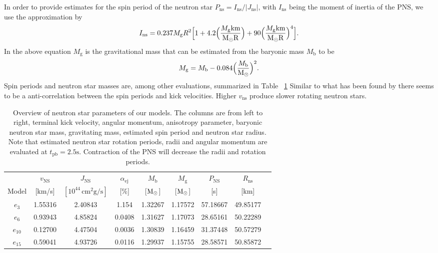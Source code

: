 \documentclass[fleqn,usenatbib]{mnras}
\newcommand{\tpb}{\ensuremath{t_{\text{pb}}}}
\newcommand{\solm}{\xspace\ensuremath{\rm{M_{\odot}}}\xspace}
\renewcommand{\sec}{\xspace\ensuremath{\text{s}}}
\newcommand{\rns}{$R_{\mathrm{ns}}$\xspace\xspace}
\begin{document}
In order to provide estimates for the spin period of the neutron star $P_{\mathrm{ns}}=I_{\mathrm{ns}}/|J_{\mathrm{ns}}|$, with $I_{\mathrm{ns}}$ being the moment of inertia of the PNS, we use the approximation by \citet{Lattimer2004}
\begin{equation}
    I_{\mathrm{ns}} = 0.237M_{\mathrm{g}}R^2\Big[ 1 + 
    4.2 \Big( \frac{M_{\mathrm{g}} \mathrm{km }}{\solm R}\Big)  + 
    90 \Big( \frac{M_{\mathrm{g}} \mathrm{km }}{\solm R}\Big)^4
    \Big].
    \label{equ: ins}
\end{equation}
In the above equation $M_{\mathrm{g}}$ is the gravitational mass that can be estimated from the baryonic mass $M_{\mathrm{b}}$ to be \citep{Lattimer2000}
\begin{equation}
    M_{\mathrm{g}} = M_{\mathrm{b}} - 0.084\Big( \frac{M_{\mathrm{b}}}{\solm}\Big)^2.
\end{equation}Spin periods and neutron star masses are, among other evaluations, summarized in Table ~\ref{tab:neutron star}
Similar to what has been found by \citet{Mueller2019} there seems to be a anti-correlation between the spin periods and kick velocities. Higher $v_{\mathrm{ns}}$ produce slower rotating neutron stars.

\begin{table}
\centering
\begin{tabular}{ccccccccc}
            & $v_{\mathrm{NS}}$& $J_{\mathrm{NS}}$    & $\alpha_{\mathrm{ej}}$& $M_{\mathrm{b}}$& $M_{\mathrm{g}}$ & $P_{\mathrm{NS}}$& \rns \\
    Model & [km/s]           & $[10^{44}\, \mathrm{cm^2 g/s}]$ &         [\%]              &  [\solm]        &  [\solm]         & [s]              &  [km] \\
    
    \hline 
    $e_{3}$  &      1.55316 &             2.40843 &   1.154 &     1.32267 &      1.17572 &  57.18667 &  49.85177 \\
    $e_{6}$  &      0.93943 &             4.85824 &   0.0408 &     1.31627 &      1.17073 &  28.65161 &  50.22289 \\
    $e_{10}$ &      0.12700 &             4.47504 &   0.0036 &     1.30839 &      1.16459 &  31.37448 &  50.57279 \\
    $e_{15}$ &      0.59041 &             4.93726 &   0.0116 &     1.29937 &      1.15755 &  28.58571 &  50.85872
\end{tabular}
\caption{Overview of neutron star parameters of our models. The columns are from left to right, terminal kick velocity, angular momentum, anisotropy parameter, baryonic neutron star mass, gravitating mass, estimated spin period and neutron star radius. Note that estimated neutron star rotation periods, radii and angular momentum are evaluated at $\tpb=2.5\sec$. Contraction of the PNS will decrease the radii and rotation periods. }
\label{tab:neutron star}
\end{table}
\end{document}
